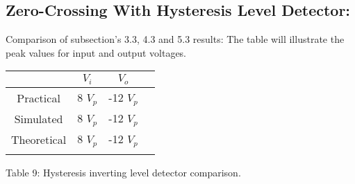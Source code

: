 \subsection{Zero-Crossing With Hysteresis Level Detector:}

Comparison of subsection's 3.3, 4.3 and 5.3 results: The table will illustrate the peak values for input and output voltages. \hfill \break

\begin{center}
\begin{tabular}[.5cm]{c c c c}
\toprule
\toprule
& \hspace{60pt} $V_{i}$ \hspace{60pt} &  \hspace{60pt} \hspace{60pt} $V_{o}$ \hspace{60pt} \hspace{60pt}  \\
\midrule
\midrule
Practical & 8 $V_{p}$ & -12 $V_{p}$ \\
\cmidrule{1-3}
Simulated & 8 $V_{p}$ & -12 $V_{p}$ \\
\cmidrule{1-3}
Theoretical & 8 $V_{p}$ & -12 $V_{p}$ \\
\bottomrule
\linebreak
\end{tabular}
\linebreak Table 9: Hysteresis inverting level detector comparison.
\end{center}

\pagebreak